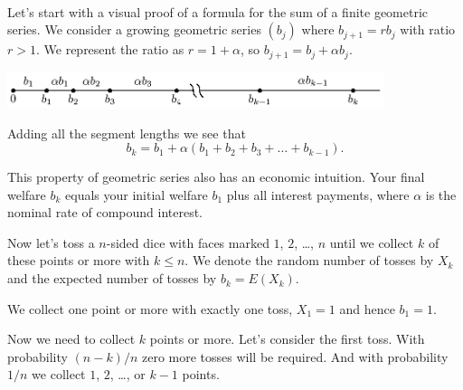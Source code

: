 \documentclass{article}
\theoremstyle{plain}
\begin{document}
\begin{filler}
[white]
\\


\noindent Let's start with a visual proof of a formula for the sum of a  finite geometric series.
We consider a growing geometric series $(b_j)$ where $b_{j + 1} = r b_j$ with ratio $r > 1$.
We represent the ratio as $r = 1 + \alpha$, so $b_{j + 1} = b_j + \alpha b_j$.

\includegraphics[width=11cm]{geometric_series.eps}


% 
% 
		

Adding all the segment lengths we see that
\[
b_{k} = b_1 + \alpha (b_1 + b_2 + b_3 + \ldots + b_{k-1}).
\]

This property of geometric series also has an economic intuition. 
Your final welfare $b_k$ equals your initial welfare $b_1$ plus all interest payments,
where $\alpha$ is the nominal rate of compound interest.


Now let's toss a $n$-sided dice with faces marked $1$, $2$, \ldots, $n$ 
until we collect $k$ of these points or more with $k\leq n$.
We denote the random number of tosses by $X_k$ and the expected number of tosses 
by $b_k = E(X_k)$. 

We collect one point or more with exactly one toss, $X_1 = 1$ and hence $b_1 = 1$. 

Now we need to collect $k$ points or more. Let's consider the first toss.
With probability $(n - k)/n$ zero more tosses will be required. 
And with probability $1/n$ we collect $1$, $2$, \ldots, or $k-1$ points.


\end{filler}
\end{document}
